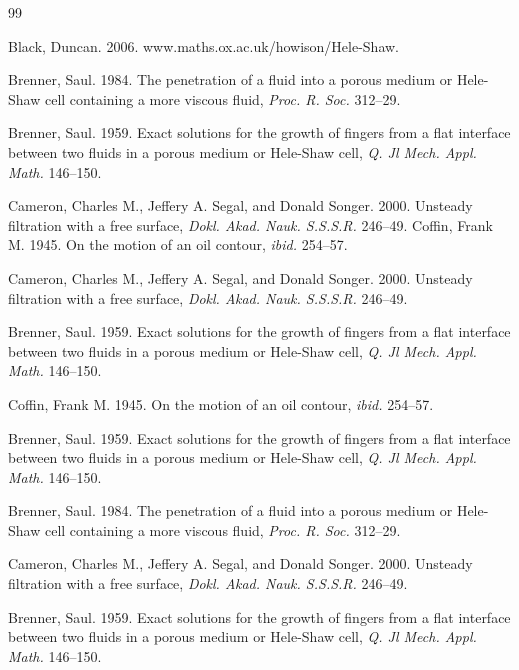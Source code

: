 \documentclass{article}
\begin{document}
\begin{thebibliography}{99}

Black, Duncan. 2006. www.maths.ox.ac.uk/howison/Hele-Shaw. 

Brenner, Saul. 1984. The penetration of a fluid into a porous
medium or Hele-Shaw cell containing a more viscous fluid, {\it Proc. R.
Soc.} 312--29.

Brenner, Saul. 1959. Exact solutions for the growth of fingers from a flat interface between two fluids in a porous medium or Hele-Shaw cell, {\it Q. Jl Mech. Appl. Math.} 146--150.

Cameron, Charles M., Jeffery A. Segal, and Donald Songer. 2000. Unsteady filtration with a  free surface, {\it Dokl. Akad. Nauk. S.S.S.R.}  246--49.          
Coffin, Frank M. 1945. On the motion
of an oil contour,  {\it ibid.} 254--57.

Cameron, Charles M., Jeffery A. Segal, and Donald Songer. 2000. Unsteady filtration with a  free surface, {\it Dokl. Akad. Nauk. S.S.S.R.}  246--49. 

Brenner, Saul. 1959. Exact solutions for the growth of fingers from a flat interface between two fluids in a porous medium or Hele-Shaw cell, {\it Q. Jl Mech. Appl. Math.} 146--150.


Coffin, Frank M. 1945. On the motion
of an oil contour,  {\it ibid.} 254--57.


Brenner, Saul. 1959. Exact solutions for the growth of fingers from a flat interface between two fluids in a porous medium or Hele-Shaw cell, {\it Q. Jl Mech. Appl. Math.} 146--150.


Brenner, Saul. 1984. The penetration of a fluid into a porous
medium or Hele-Shaw cell containing a more viscous fluid, {\it Proc. R.
Soc.} 312--29.


Cameron, Charles M., Jeffery A. Segal, and Donald Songer. 2000. Unsteady filtration with a  free surface, {\it Dokl. Akad. Nauk. S.S.S.R.}  246--49. 

Brenner, Saul. 1959. Exact solutions for the growth of fingers from a flat interface between two fluids in a porous medium or Hele-Shaw cell, {\it Q. Jl Mech. Appl. Math.} 146--150.



\end{thebibliography}
\end{document}
